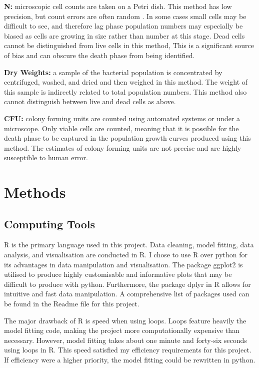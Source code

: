 \documentclass[11pt]{article}
\begin{document}
  \textbf{N:} microscopic cell counts are taken on a Petri dish. This method has low precision, but count errors are often random \cite{Madigan_Michael2021-07-01}. In some cases small cells may be difficult to see, and therefore lag phase population numbers may especially be biased as cells are growing in size rather than number at this stage. Dead cells cannot be distinguished from live cells in this method, This is a significant source of bias and can obscure the death phase from being identified. 

  \textbf{Dry Weights:} a sample of the bacterial population is concentrated by centrifuged, washed, and dried and then weighed in this method. The weight of this sample is indirectly related to total population numbers. This method also cannot distinguish between live and dead cells as above. 

  \textbf{CFU:} colony forming units are counted using automated systems or under a microscope. Only viable cells are counted, meaning that it is possible for the death phase to be captured in the population growth curves produced using this method. The estimates of colony forming units are not precise and are highly susceptible to human error.  \section{Methods}
  \subsection{Computing Tools}
  R is the primary language used in this project. Data cleaning, model fitting, data analysis, and visualisation are conducted in R. I chose to use R over python for its advantages in data manipulation and visualisation. The package ggplot2 is utilised to produce highly customisable and informative plots that may be difficult to produce with python. Furthermore, the package dplyr in R allows for intuitive and fast data manipulation. A comprehensive list of packages used can be found in the Readme file for this project. 
  
  The major drawback of R is speed when using loops. Loops feature heavily the model fitting code, making the project more computationally expensive than necessary. However, model fitting takes about one minute and forty-six seconds using loops in R. This speed satisfied my efficiency requirements for this project. If efficiency were a higher priority, the model fitting could be rewritten in python. 
\end{document}

